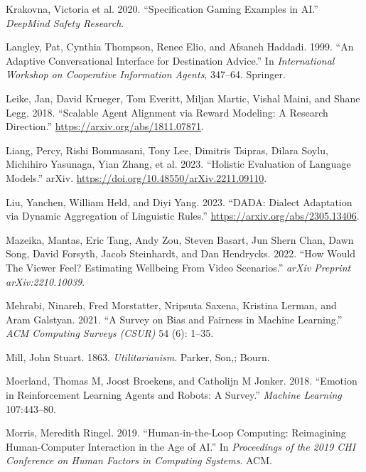 \documentclass[
  letterpaper,
  numbers=noenddot,
  DIV=11,
  oneside]{scrreprt}
\newlength{\cslhangindent}
\newenvironment{CSLReferences}[2] %
 {\begin{list}{}{%
  \setlength{\itemindent}{0pt}
  \setlength{\leftmargin}{0pt}
  \setlength{\parsep}{0pt}
  \ifodd #1
   \setlength{\leftmargin}{\cslhangindent}
   \setlength{\itemindent}{-1\cslhangindent}
  \fi
  \setlength{\itemsep}{#2\baselineskip}}}
 {\end{list}}
\theoremstyle{remark}
\begin{document}
\begin{CSLReferences}{1}{0}
Krakovna, Victoria et al. 2020. {``Specification Gaming Examples in
AI.''} \emph{DeepMind Safety Research}.

Langley, Pat, Cynthia Thompson, Renee Elio, and Afsaneh Haddadi. 1999.
{``An Adaptive Conversational Interface for Destination Advice.''} In
\emph{International Workshop on Cooperative Information Agents},
347--64. Springer.

Leike, Jan, David Krueger, Tom Everitt, Miljan Martic, Vishal Maini, and
Shane Legg. 2018. {``Scalable Agent Alignment via Reward Modeling: A
Research Direction.''} \url{https://arxiv.org/abs/1811.07871}.

Liang, Percy, Rishi Bommasani, Tony Lee, Dimitris Tsipras, Dilara Soylu,
Michihiro Yasunaga, Yian Zhang, et al. 2023. {``Holistic {Evaluation} of
{Language} {Models}.''} arXiv.
\url{https://doi.org/10.48550/arXiv.2211.09110}.

Liu, Yanchen, William Held, and Diyi Yang. 2023. {``DADA: Dialect
Adaptation via Dynamic Aggregation of Linguistic Rules.''}
\url{https://arxiv.org/abs/2305.13406}.

Mazeika, Mantas, Eric Tang, Andy Zou, Steven Basart, Jun Shern Chan,
Dawn Song, David Forsyth, Jacob Steinhardt, and Dan Hendrycks. 2022.
{``How {Would} {The} {Viewer} {Feel}? {Estimating} {Wellbeing} {From}
{Video} {Scenarios}.''} \emph{arXiv Preprint arXiv:2210.10039}.

Mehrabi, Ninareh, Fred Morstatter, Nripsuta Saxena, Kristina Lerman, and
Aram Galstyan. 2021. {``A Survey on Bias and Fairness in Machine
Learning.''} \emph{ACM Computing Surveys (CSUR)} 54 (6): 1--35.

Mill, John Stuart. 1863. \emph{Utilitarianism}. Parker, Son,; Bourn.

Moerland, Thomas M, Joost Broekens, and Catholijn M Jonker. 2018.
{``Emotion in Reinforcement Learning Agents and Robots: A Survey.''}
\emph{Machine Learning} 107:443--80.

Morris, Meredith Ringel. 2019. {``Human-in-the-Loop Computing:
Reimagining Human-Computer Interaction in the Age of AI.''} In
\emph{Proceedings of the 2019 CHI Conference on Human Factors in
Computing Systems}. ACM.


\end{CSLReferences}
\end{document}
